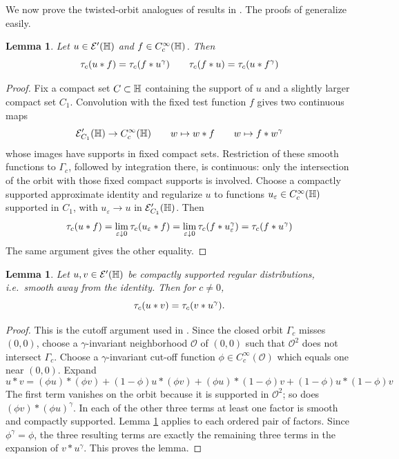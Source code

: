 \documentclass[11pt]{amsart}
\theoremstyle{plain}
\newtheorem{lemma}[theorem]{Lemma}
\theoremstyle{definition}
\theoremstyle{remark}
\begin{document}
We now prove the twisted-orbit analogues of results in \cite[Section 2]{GvE25}.
The proofs of \cite{GvE25} generalize easily.

\begin{lemma}
\label{prop:mixed-twisted-orbit}
Let $u\in\mathcal E'(\mathbb{H})$ and $f\in C_c^\infty(\mathbb{H})$. Then
\begin{equation*}
       \tau_{c}(u*f)=\tau_{c}(f*u^\gamma)\qquad \tau_{c}(f\ast u)=\tau_{c}(u*f^\gamma)
\end{equation*}
\end{lemma}

\begin{proof}
Fix a compact set $C\subset \mathbb{H}$ containing the support of $u$ and a slightly larger compact set $C_1$.
Convolution with the fixed test function $f$ gives two continuous maps
\[
 \mathcal E'_{C_1}(\mathbb{H})\to C_c^\infty(\mathbb{H})
 \qquad
 w\mapsto w*f
 \qquad
 w\mapsto f*w^\gamma
\]
whose images have supports in fixed compact sets. Restriction of these
smooth functions to $\Gamma_{c}$, followed by integration there, is
continuous: only the intersection of the orbit with those fixed compact
supports is involved. Choose a compactly supported approximate identity
and regularize $u$ to functions
$u_\varepsilon\in C_c^\infty(\mathbb{H})$ supported in $C_1$, with
$u_\varepsilon\to u$ in $\mathcal E'_{C_1}(\mathbb{H})$.
Then
\[ \tau_{c}(u*f)=\lim_{\varepsilon\downarrow 0} \tau_{c}(u_\varepsilon\ast f)=\lim_{\varepsilon\downarrow 0} \tau_{c}(f\ast u_\varepsilon^\gamma) =\tau_{c}(f*u^\gamma)\]
The same argument gives the other equality.
\end{proof}

\begin{lemma}
\label{thm:smooth-twisted-trace}
Let $u,v\in\mathcal E'(\mathbb{H})$ be compactly supported regular distributions, i.e.\ smooth away from the identity. Then for $c\ne 0$,
\begin{equation}\label{eq:compact-regular-twisted-trace}
       \tau_{c}(u*v)=\tau_{c}(v*u^\gamma).
\end{equation}
\end{lemma}

\begin{proof}
This is the cutoff argument used in \cite[Lemma~2.3]{GvE25}.
Since the closed orbit $\Gamma_{c}$ misses $(0,0)$,
choose a $\gamma$-invariant neighborhood $\mathcal O$ of $(0,0)$ such that $\mathcal O^2$ does not intersect $\Gamma_{c}$.
Choose a $\gamma$-invariant cut-off function $\phi\in C_c^\infty(\mathcal O)$ which equals one near $(0,0)$. Expand
\[
 u*v=(\phi u)*(\phi v)
 +(1-\phi)u*(\phi v)+(\phi u)*(1-\phi)v
 +(1-\phi)u*(1-\phi)v
\]
The first term vanishes on the orbit because it is supported in
$\mathcal O^2$; so does $(\phi v)*(\phi u)^\gamma$.
In each of the other three terms at least one factor
is smooth and compactly supported. Lemma
\ref{prop:mixed-twisted-orbit} applies to each ordered pair of factors.
Since $\phi^\gamma=\phi$, the three resulting terms are exactly the remaining
three terms in the expansion of $v*u^\gamma$. This proves the lemma.
\end{proof}
\end{document}
